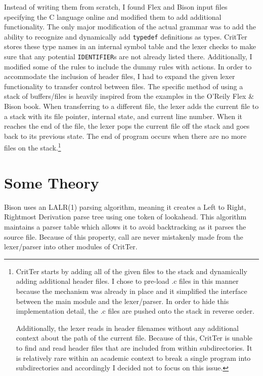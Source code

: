 \documentclass[12pt]{report}
\newcommand{\programName}{CritTer\xspace}
\begin{document}
Instead of writing them from scratch, I found Flex and Bison input files specifying the C language
online\cite{originalGrammar} and modified them to add additional functionality. The only major 
modification of the actual grammar was to add the ability to recognize and dynamically add 
\lstinline{typedef} definitions as types. \programName stores these type names in an internal symbol 
table and the lexer checks to make sure that any potential \lstinline{IDENTIFIER}s are not already listed 
there. Additionally, I modified some of the rules to include the dummy rules with actions. In 
order to accommodate the inclusion of header files, I had to expand the given lexer functionality to 
transfer control between files. The specific method of using a stack of buffers\slash files is heavily 
inspired from the examples in the O'Reily Flex \& Bison book\cite{flex-and-bison}. When transferring to a 
different file, the lexer adds the current file to a stack with its file pointer, internal state, and current line 
number. When it reaches the end of the file, the lexer pops the current file off the stack and goes back 
to its previous state. The end of program occurs when there are no more files on the 
stack.\footnote{\programName starts by adding all of the given files to the stack and dynamically adding 
additional header files. I chose to pre-load .c files in this manner because the mechanism was already in 
place and it simplified the interface between the main module and the lexer\slash parser. In order to hide 
this implementation detail, the .c files are pushed onto the stack in reverse order.

Additionally, the lexer reads in header filenames without any additional context about the path of the 
current file. Because of this, \programName is unable to find and read header files that are included from 
within subdirectories. It is relatively rare within an academic context to break a single program into 
subdirectories and accordingly I decided not to focus on this issue.} 

\section{Some Theory}
Bison uses an LALR(1) parsing algorithm, meaning it creates a Left to Right, Rightmost Derivation parse 
tree using one token of lookahead. This algorithm maintains a parser table which allows it to avoid 
backtracking as it parses the source file. Because of this property, call are never mistakenly made from 
the lexer/parser into other modules of \programName.
\end{document}

